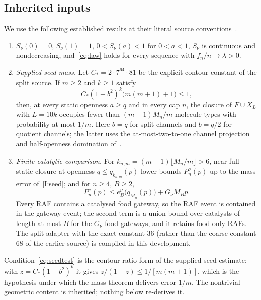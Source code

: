 \documentclass[11pt,a4paper]{article}
\theoremstyle{plain}
\theoremstyle{definition}
\theoremstyle{remark}
\begin{document}
\subsection{Inherited inputs}\label{sec:inherited}
We use the following established results at their literal source conventions~\cite{splitwindow2026,quotientwindow2026}.
\begin{enumerate}[label=(I\arabic*),leftmargin=3em]
\item\label{I:law} $S_\nu(0)=0$, $S_\nu(1)=1$, $0<S_\nu(a)<1$ for $0<a<1$, $S_\nu$ is continuous and nondecreasing, and~\eqref{eq:law} holds for every sequence with $f_n/n\to\lambda>0$.
\item\label{I:seed} \emph{Supplied-seed mass.} Let $C_*=2\cdot7^{64}\cdot81$ be the explicit contour constant of the split source. If $m\ge2$ and $k\ge1$ satisfy
\begin{equation}\label{eq:seedtest}
C_*(1-b^2)^k\bigl(m(m+1)+1\bigr)\le1,
\end{equation}
then, at every static openness $a\ge q$ and in every cap $n$, the closure of $F\cup X_L$ with $L=10k$ occupies fewer than $(m-1)M_n/m$ molecule types with probability at most $1/m$. Here $b=q$ for split channels and $b=q/2$ for quotient channels; the latter uses the at-most-two-to-one channel projection and half-openness domination of~\cite{quotientwindow2026}.
\item\label{I:source} \emph{Finite catalytic comparison.} For $k_{n,m}=(m-1)\lfloor M_n/m\rfloor>6$, near-full static closure at openness $q\le q_{k_{n,m}}(p)$ lower-bounds $P_n^\nu(p)$ up to the mass error of~\ref{I:seed}; and for $n\ge4$, $B\ge2$,
\begin{equation}\label{eq:sourceupper}
P_n^\nu(p)\le e^\nu_B\bigl(q_{M_n}(p)\bigr)+G_\nu M_Bp .
\end{equation}
Every RAF contains a catalysed food gateway, so the RAF event is contained in the gateway event; the second term is a union bound over catalysts of length at most $B$ for the $G_\nu$ food gateways, and it retains food-only RAFs. The split adapter with the exact constant $36$ (rather than the coarse constant $68$ of the earlier source) is compiled in this development.
\end{enumerate}
Condition~\eqref{eq:seedtest} is the contour-ratio form of the supplied-seed estimate: with $z=C_*(1-b^2)^k$ it gives $z/(1-z)\le1/[m(m+1)]$, which is the hypothesis under which the mass theorem delivers error $1/m$. The nontrivial geometric content is inherited; nothing below re-derives it.
\end{document}
